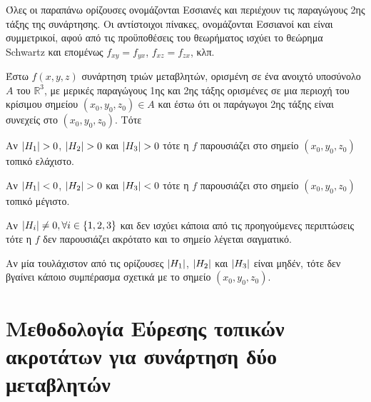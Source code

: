 \begin{rem}
  Όλες οι παραπάνω ορίζουσες ονομάζονται Εσσιανές και περιέχουν τις παραγώγους 
  2ης τάξης της συνάρτησης. Οι αντίστοιχοι πίνακες, ονομάζονται Εσσιανοί και είναι 
  συμμετρικοί, αφού από τις προϋποθέσεις του θεωρήματος ισχύει το θεώρημα Schwartz και 
  επομένως $ f_{xy} = f_{yx} $, $ f_{xz} = f_{zx} $, κλπ.
\end{rem}


\begin{thm}
  \label{thm:3var}
\item {}
  Έστω $ f(x,y,z) $ συνάρτηση τριών μεταβλητών, ορισμένη σε ένα ανοιχτό 
  υποσύνολο $A$ του $ \mathbb{R}^{3} $, με μερικές παραγώγους 1ης και 2ης τάξης 
  ορισμένες σε μια  περιοχή του κρίσιμου σημείου $ (x_{0}, y_{0}, z_{0}) \in A $ και 
  έστω ότι οι παράγωγοι 2ης τάξης είναι συνεχείς στο $ (x_{0}, y_{0}, z_{0}) $. Τότε
\end{thm}

\begin{myitemize}
  \item Αν $ \abs{H_{1}} > 0 $, $ \abs{H_{2}} > 0 $ και $ \abs{H_{3}} > 0 $ 
    τότε η $f$ παρουσιάζει στο σημείο $ (x_{0}, y_{0}, z_{0}) $ τοπικό ελάχιστο.
  \item Αν $ \abs{H_{1}} < 0 $, $ \abs{H_{2}} > 0 $ και $ \abs{H_{3}} < 0 $ 
    τότε η $f$ παρουσιάζει στο σημείο $ (x_{0}, y_{0}, z_{0}) $ τοπικό μέγιστο.
  \item Αν $ \abs{H_{i}} \neq 0, \forall i \in \{1,2,3\} $ και δεν ισχύει κάποια 
    από τις προηγούμενες περιπτώσεις τότε η $f$ δεν παρουσιάζει ακρότατο και το 
    σημείο λέγεται σαγματικό.
  \item Αν μία τουλάχιστον από τις ορίζουσες $ \abs{H_{1}} $, $ \abs{H_{2}} $ και 
    $ \abs{H_{3}} $ είναι μηδέν, τότε δεν βγαίνει κάποιο συμπέρασμα σχετικά με το 
    σημείο $ (x_{0}, y_{0}, z_{0}) $.
\end{myitemize}

\section{Μεθοδολογία Εύρεσης τοπικών ακροτάτων για συνάρτηση δύο μεταβλητών}


